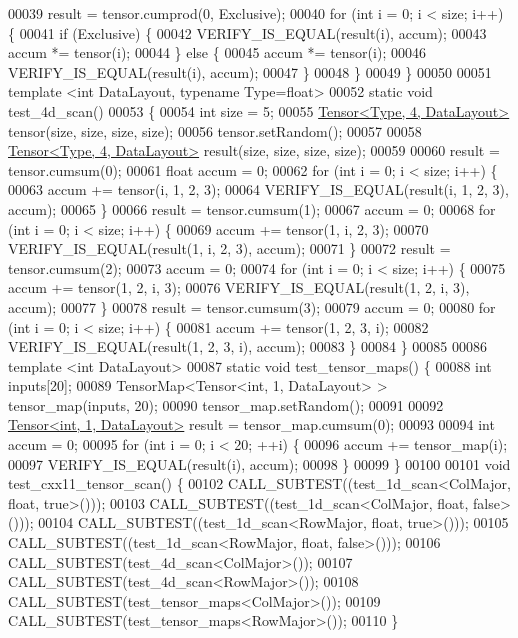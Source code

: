 \begin{DoxyCode}
00039   result = tensor.cumprod(0, Exclusive);
00040   \textcolor{keywordflow}{for} (\textcolor{keywordtype}{int} i = 0; i < size; i++) \{
00041     \textcolor{keywordflow}{if} (Exclusive) \{
00042       VERIFY\_IS\_EQUAL(result(i), accum);
00043       accum *= tensor(i);
00044     \} \textcolor{keywordflow}{else} \{
00045       accum *= tensor(i);
00046       VERIFY\_IS\_EQUAL(result(i), accum);
00047     \}
00048   \}
00049 \}
00050 
00051 \textcolor{keyword}{template} <\textcolor{keywordtype}{int} DataLayout, \textcolor{keyword}{typename} Type=\textcolor{keywordtype}{float}>
00052 \textcolor{keyword}{static} \textcolor{keywordtype}{void} test\_4d\_scan()
00053 \{
00054   \textcolor{keywordtype}{int} size = 5;
00055   \hyperlink{class_eigen_1_1_tensor}{Tensor<Type, 4, DataLayout>} tensor(size, size, size, size);
00056   tensor.setRandom();
00057 
00058   \hyperlink{class_eigen_1_1_tensor}{Tensor<Type, 4, DataLayout>} result(size, size, size, size);
00059 
00060   result = tensor.cumsum(0);
00061   \textcolor{keywordtype}{float} accum = 0;
00062   \textcolor{keywordflow}{for} (\textcolor{keywordtype}{int} i = 0; i < size; i++) \{
00063     accum += tensor(i, 1, 2, 3);
00064     VERIFY\_IS\_EQUAL(result(i, 1, 2, 3), accum);
00065   \}
00066   result = tensor.cumsum(1);
00067   accum = 0;
00068   \textcolor{keywordflow}{for} (\textcolor{keywordtype}{int} i = 0; i < size; i++) \{
00069     accum += tensor(1, i, 2, 3);
00070     VERIFY\_IS\_EQUAL(result(1, i, 2, 3), accum);
00071   \}
00072   result = tensor.cumsum(2);
00073   accum = 0;
00074   \textcolor{keywordflow}{for} (\textcolor{keywordtype}{int} i = 0; i < size; i++) \{
00075     accum += tensor(1, 2, i, 3);
00076     VERIFY\_IS\_EQUAL(result(1, 2, i, 3), accum);
00077   \}
00078   result = tensor.cumsum(3);
00079   accum = 0;
00080   \textcolor{keywordflow}{for} (\textcolor{keywordtype}{int} i = 0; i < size; i++) \{
00081     accum += tensor(1, 2, 3, i);
00082     VERIFY\_IS\_EQUAL(result(1, 2, 3, i), accum);
00083   \}
00084 \}
00085 
00086 \textcolor{keyword}{template} <\textcolor{keywordtype}{int} DataLayout>
00087 \textcolor{keyword}{static} \textcolor{keywordtype}{void} test\_tensor\_maps() \{
00088   \textcolor{keywordtype}{int} inputs[20];
00089   TensorMap<Tensor<int, 1, DataLayout> > tensor\_map(inputs, 20);
00090   tensor\_map.setRandom();
00091 
00092   \hyperlink{class_eigen_1_1_tensor}{Tensor<int, 1, DataLayout>} result = tensor\_map.cumsum(0);
00093 
00094   \textcolor{keywordtype}{int} accum = 0;
00095   \textcolor{keywordflow}{for} (\textcolor{keywordtype}{int} i = 0; i < 20; ++i) \{
00096     accum += tensor\_map(i);
00097     VERIFY\_IS\_EQUAL(result(i), accum);
00098   \}
00099 \}
00100 
00101 \textcolor{keywordtype}{void} test\_cxx11\_tensor\_scan() \{
00102   CALL\_SUBTEST((test\_1d\_scan<ColMajor, float, true>()));
00103   CALL\_SUBTEST((test\_1d\_scan<ColMajor, float, false>()));
00104   CALL\_SUBTEST((test\_1d\_scan<RowMajor, float, true>()));
00105   CALL\_SUBTEST((test\_1d\_scan<RowMajor, float, false>()));
00106   CALL\_SUBTEST(test\_4d\_scan<ColMajor>());
00107   CALL\_SUBTEST(test\_4d\_scan<RowMajor>());
00108   CALL\_SUBTEST(test\_tensor\_maps<ColMajor>());
00109   CALL\_SUBTEST(test\_tensor\_maps<RowMajor>());
00110 \}
\end{DoxyCode}
